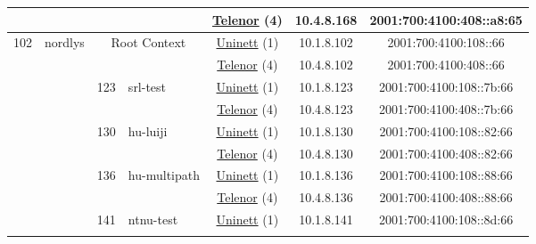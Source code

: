 \begin{small}
\begin{center}
\begin{longtable}{|c|c|c|c|c|c|c|c|}
  &  &  &  & \multicolumn{2}{|c|}{\tiny{\href{https://www.telenor.no}{Telenor} (4)}} & \tiny{10.4.8.168} & \tiny{2001:700:4100:408::a8:65} \\ \hline
 \multirow{18}{*}{\tiny{102}} & \multicolumn{1}{|l|}{\multirow{18}{*}{\tiny{nordlys}}} & \multicolumn{2}{|c|}{\multirow{2}{*}{\tiny{Root Context}}} & \multicolumn{2}{|c|}{\tiny{\href{https://www.uninett.no}{Uninett} (1)}} & \tiny{10.1.8.102} & \tiny{2001:700:4100:108::66} \\* \cline{5-5}\cline{6-6}\cline{7-7}\cline{8-8}
  &  & \multicolumn{2}{|c|}{} & \multicolumn{2}{|c|}{\tiny{\href{https://www.telenor.no}{Telenor} (4)}} & \tiny{10.4.8.102} & \tiny{2001:700:4100:408::66} \\* \cline{3-3}\cline{4-4}\cline{5-5}\cline{6-6}\cline{7-7}\cline{8-8}
  &  & \multirow{2}{*}{\tiny{123}} & \multicolumn{1}{|l|}{\multirow{2}{*}{\tiny{srl-test}}} & \multicolumn{2}{|c|}{\tiny{\href{https://www.uninett.no}{Uninett} (1)}} & \tiny{10.1.8.123} & \tiny{2001:700:4100:108::7b:66} \\* \cline{5-5}\cline{6-6}\cline{7-7}\cline{8-8}
  &  &  &  & \multicolumn{2}{|c|}{\tiny{\href{https://www.telenor.no}{Telenor} (4)}} & \tiny{10.4.8.123} & \tiny{2001:700:4100:408::7b:66} \\* \cline{3-3}\cline{4-4}\cline{5-5}\cline{6-6}\cline{7-7}\cline{8-8}
  &  & \multirow{2}{*}{\tiny{130}} & \multicolumn{1}{|l|}{\multirow{2}{*}{\tiny{hu-luiji}}} & \multicolumn{2}{|c|}{\tiny{\href{https://www.uninett.no}{Uninett} (1)}} & \tiny{10.1.8.130} & \tiny{2001:700:4100:108::82:66} \\* \cline{5-5}\cline{6-6}\cline{7-7}\cline{8-8}
  &  &  &  & \multicolumn{2}{|c|}{\tiny{\href{https://www.telenor.no}{Telenor} (4)}} & \tiny{10.4.8.130} & \tiny{2001:700:4100:408::82:66} \\* \cline{3-3}\cline{4-4}\cline{5-5}\cline{6-6}\cline{7-7}\cline{8-8}
  &  & \multirow{2}{*}{\tiny{136}} & \multicolumn{1}{|l|}{\multirow{2}{*}{\tiny{hu-multipath}}} & \multicolumn{2}{|c|}{\tiny{\href{https://www.uninett.no}{Uninett} (1)}} & \tiny{10.1.8.136} & \tiny{2001:700:4100:108::88:66} \\* \cline{5-5}\cline{6-6}\cline{7-7}\cline{8-8}
  &  &  &  & \multicolumn{2}{|c|}{\tiny{\href{https://www.telenor.no}{Telenor} (4)}} & \tiny{10.4.8.136} & \tiny{2001:700:4100:408::88:66} \\* \cline{3-3}\cline{4-4}\cline{5-5}\cline{6-6}\cline{7-7}\cline{8-8}
  &  & \multirow{2}{*}{\tiny{141}} & \multicolumn{1}{|l|}{\multirow{2}{*}{\tiny{ntnu-test}}} & \multicolumn{2}{|c|}{\tiny{\href{https://www.uninett.no}{Uninett} (1)}} & \tiny{10.1.8.141} & \tiny{2001:700:4100:108::8d:66} \\* \cline{5-5}\cline{6-6}\cline{7-7}\cline{8-8}

\end{longtable}
\end{center}
\end{small}
